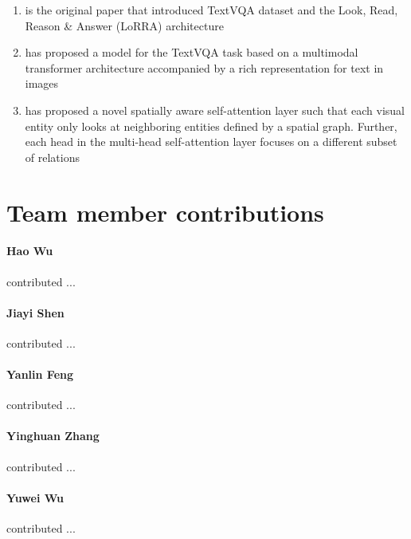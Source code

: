 \documentclass[11pt,a4paper]{article}
\begin{document}
\begin{enumerate}
	\item \cite{Singh_2019_CVPR} is the original paper that introduced TextVQA dataset and the Look, Read, Reason \& Answer (LoRRA) architecture
	\item \cite{hu2020iterative} has proposed a model for the TextVQA task based on a multimodal transformer architecture accompanied by a rich representation for text in images
	\item \cite{kant2020spatially} has proposed a novel spatially aware self-attention layer such that each visual entity only looks at neighboring entities defined by a spatial graph. Further, each head in the multi-head self-attention layer focuses on a different subset of relations
\end{enumerate}




\clearpage
\section{Team member contributions}
\paragraph{Hao Wu} contributed ...

\paragraph{Jiayi Shen} contributed ...

\paragraph{Yanlin Feng} contributed ...

\paragraph{Yinghuan Zhang} contributed ...

\paragraph{Yuwei Wu} contributed ...


\clearpage



\end{document}
